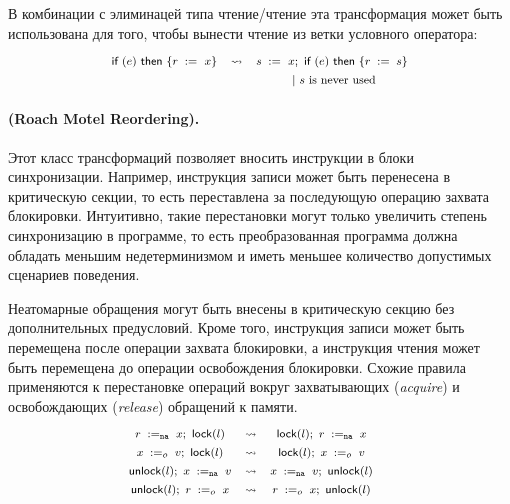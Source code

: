 В комбинации с элиминацей типа чтение/чтение 
эта трансформация может быть использована 
для того, чтобы вынести чтение из 
ветки условного оператора:
%
\[\def\arraystretch{1.4}\footnotesize
  \begin{array}{ccc} 

      \kw{if} (e)~ \kw{then} \{ \readInst{}{r}{x} \}
    & \leadsto 
    & \readInst{}{s}{x} \seq \kw{if} (e)~ \kw{then} \{ \assignInst{r}{s} \} \\
    & & ~|~ \text{$s$ is never used}  \\ 

  \end{array}
\]

\paragraph{
(Roach Motel Reordering).
}

Этот класс трансформаций позволяет вносить инструкции в блоки синхронизации. 
Например, инструкция записи может быть 
перенесена в критическую секции, то есть
переставлена за последующую операцию захвата блокировки. 
Интуитивно, такие перестановки могут 
только увеличить степень синхронизацию в программе, 
то есть преобразованная программа 
должна обладать меньшим недетерминизмом 
и иметь меньшее количество допустимых сценариев поведения. 

Неатомарные обращения могут быть внесены 
в критическую секцию без дополнительных предусловий. 
Кроме того, инструкция записи может быть перемещена после 
операции захвата блокировки, а инструкция чтения 
может быть перемещена до операции освобождения блокировки. 
Схожие правила применяются к перестановке операций вокруг 
захватывающих (\emph{acquire}) и освобождающих (\emph{release}) 
обращений к памяти. 
\[\def\arraystretch{1.4}\footnotesize
  \begin{array}{cccl} 

      \readInst{\na}{r}{x} \seq \lockInst{l} 
    & \leadsto 
    & \lockInst{l} \seq \readInst{\na}{r}{x}
    & ~ \\ 

      \writeInst{o}{x}{v} \seq \lockInst{l} 
    & \leadsto 
    & \lockInst{l} \seq \writeInst{o}{x}{v}
    & ~  \\ 

      \unlockInst{l} \seq \writeInst{\na}{x}{v} 
    & \leadsto 
    & \writeInst{\na}{x}{v} \seq \unlockInst{l}
    & ~ \\ 


      \unlockInst{l} \seq \readInst{o}{r}{x} 
    & \leadsto 
    & \readInst{o}{r}{x} \seq \unlockInst{l}
    & ~  \\ 

  \end{array}
\]


